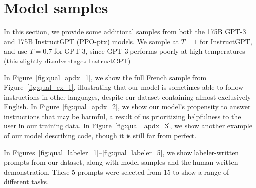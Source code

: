 \newpage
\section{Model samples}

In this section, we provide some additional samples from both the 175B GPT-3 and 175B InstructGPT (PPO-ptx) models. We sample at $T=1$ for InstructGPT, and use $T=0.7$ for GPT-3, since GPT-3 performs poorly at high temperatures (this slightly disadvantages InstructGPT). 

In Figure~\ref{fig:qual_apdx_1}, we show the full French sample from Figure~\ref{fig:qual_ex_1}, illustrating that our model is sometimes able to follow instructions in other languages, despite our dataset containing almost exclusively English. In Figure~\ref{fig:qual_apdx_2}, we show our model's propensity to answer instructions that may be harmful, a result of us prioritizing helpfulness to the user in our training data. In Figure~\ref{fig:qual_apdx_3}, we show another example of our model describing code, though it is still far from perfect.

In Figures~\ref{fig:qual_labeler_1}--\ref{fig:qual_labeler_5}, we show labeler-written prompts from our dataset, along with model samples and the human-written demonstration. These 5 prompts were selected from 15 to show a range of different tasks. 






